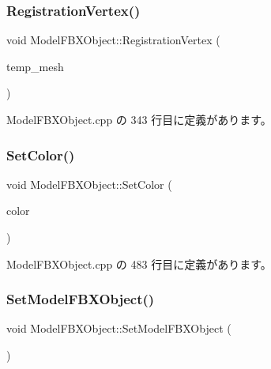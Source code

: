 \subsubsection{\texorpdfstring{Registration\+Vertex()}{RegistrationVertex()}}
{\footnotesize\ttfamily void Model\+F\+B\+X\+Object\+::\+Registration\+Vertex (\begin{DoxyParamCaption}\item[{std\+::vector$<$ \mbox{\hyperlink{struct_model_f_b_x_object_1_1_shaderbuff}{Shaderbuff}} $>$ $\ast$}]{temp\+\_\+mesh }\end{DoxyParamCaption})\hspace{0.3cm}{\ttfamily [private]}}



 Model\+F\+B\+X\+Object.\+cpp の 343 行目に定義があります。

\mbox{\label{class_model_f_b_x_object_acbe9d90631a3ac39b9cf65097c39aaa9}} 
\subsubsection{\texorpdfstring{Set\+Color()}{SetColor()}}
{\footnotesize\ttfamily void Model\+F\+B\+X\+Object\+::\+Set\+Color (\begin{DoxyParamCaption}\item[{\mbox{\hyperlink{_vector3_d_8h_a680c30c4a07d86fe763c7e01169cd6cc}{X\+Color4}}}]{color }\end{DoxyParamCaption})}



 Model\+F\+B\+X\+Object.\+cpp の 483 行目に定義があります。

\mbox{\label{class_model_f_b_x_object_a3c101cf65da1bdb55b7a11e71cefcad0}} 
\subsubsection{\texorpdfstring{Set\+Model\+F\+B\+X\+Object()}{SetModelFBXObject()}}
{\footnotesize\ttfamily void Model\+F\+B\+X\+Object\+::\+Set\+Model\+F\+B\+X\+Object (\begin{DoxyParamCaption}{ }\end{DoxyParamCaption})}



